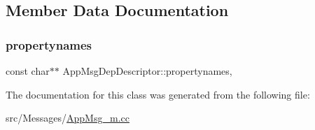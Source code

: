 \subsection{Member Data Documentation}
\mbox{\label{class_app_msg_dep_descriptor_a03578bf1418ef896a9abfcded857b728}} 
\subsubsection{\texorpdfstring{propertynames}{propertynames}}
{\footnotesize\ttfamily const char$\ast$$\ast$ App\+Msg\+Dep\+Descriptor\+::propertynames\hspace{0.3cm}{\ttfamily [mutable]}, {\ttfamily [private]}}



The documentation for this class was generated from the following file\+:\begin{DoxyCompactItemize}
\item 
src/\+Messages/\hyperlink{_app_msg__m_8cc}{App\+Msg\+\_\+m.\+cc}\end{DoxyCompactItemize}
